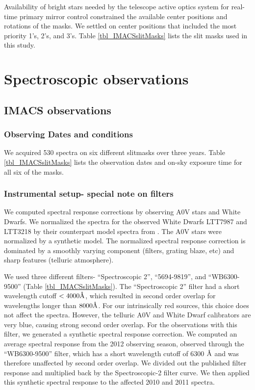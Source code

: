 Availability of bright stars needed by the telescope active optics system for real-time primary mirror control constrained the available center positions and rotations of the masks.  We settled on center positions that included the most priority 1's, 2's, and 3's.  Table \ref{tbl_IMACSslitMasks} lists the slit masks used in this study.

\begin{landscape}
	
\end{landscape}

\section{Spectroscopic observations}

\subsection{IMACS observations}
\subsubsection{Observing Dates and conditions}
We acquired 530 spectra on six different slitmasks over three years.  Table \ref{tbl_IMACSslitMasks} lists the observation dates and on-sky exposure time for all six of the masks.

\subsubsection{Instrumental setup- special note on filters}
We computed spectral response corrections by observing A0V stars and White Dwarfs.  We normalized the spectra for the observed White Dwarfs LTT7987 and LTT3218 by their counterpart model spectra from \citet{2014A&A...568A...9M}.  The A0V stars were normalized by a synthetic model.  The normalized spectral response correction is dominated by a smoothly varying component (filters, grating blaze, etc) and sharp features (telluric atmosphere).

We used three different filters- ``Spectroscopic 2'', ``5694-9819'', and ``WB6300-9500'' (Table \ref{tbl_IMACSslitMasks}).  The ``Spectroscopic 2'' filter had a short wavelength cutoff $<4000 \mbox{\normalfont\AA}$, which resulted in second order overlap for wavelengths longer than $8000 \mbox{\normalfont\AA}$.  For our intrinsically red sources, this choice does not affect the spectra.  However, the telluric A0V and White Dwarf calibrators are very blue, causing strong second order overlap.  For the observations with this filter, we generated a synthetic spectral response correction.  We computed an average spectral response from the 2012 observing season, observed through the ``WB6300-9500'' filter, which has a short wavelength cutoff of 6300 $\mbox{\normalfont\AA}$ and was therefore unaffected by second order overlap.  We divided out the published filter response and multiplied back by the Spectroscopic-2 filter curve.  We then applied this synthetic spectral response to the affected 2010 and 2011 spectra.

